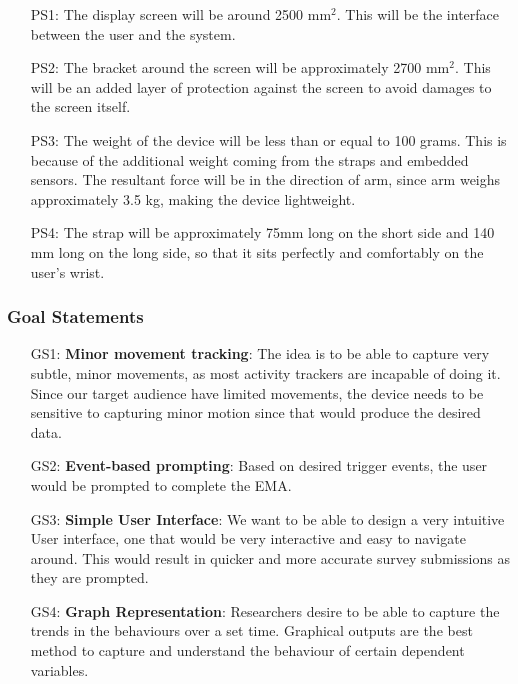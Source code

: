\documentclass[12pt]{article}
\begin{document}
\begin{itemize}

  \label{PS1}\item[PS1:] The display screen will be around 2500 mm$^2$. This will be the interface between the user and the system.
  \label{PS2}\item[PS2:] The bracket around the screen will be approximately 2700 mm$^2$. This will be an added layer of protection against the screen to avoid damages to the screen itself.
  \label{PS3}\item[PS3:] The weight of the device will be less than or equal to 100 grams. This is because of the additional weight coming from the straps and embedded sensors. The resultant force will be in the direction of arm, since arm weighs approximately 3.5 kg, making the device lightweight.
  \label{PS4}\item[PS4:] The strap will be approximately 75mm long on the short side and 140 mm long on the long side, so that it sits perfectly and comfortably on the user's wrist.

\end{itemize}


\subsubsection{Goal Statements}
\begin{itemize}

  \label{GS1} \item[GS1:] \textbf{Minor movement tracking}: The idea is to be able to capture very subtle, minor movements, as most activity trackers are incapable of doing it. Since our target audience have limited movements, the device needs to be sensitive to capturing minor motion since that would produce the desired data.
   \label{GS2}\item[GS2:] \textbf{Event-based prompting}: Based on desired trigger events, the user would be prompted to complete the EMA.
   \label{GS3}\item[GS3:] \textbf{Simple User Interface}: We want to be able to design a very intuitive User interface, one that would be very interactive and easy to navigate around. This would result in quicker and more accurate survey submissions as they are prompted.
   \label{GS4}\item[GS4:] \textbf{Graph Representation}: Researchers desire to be able to capture the trends in the behaviours over a set time. Graphical outputs are the best method to capture and understand the behaviour of certain dependent variables.

\end{itemize}
\end{document}
